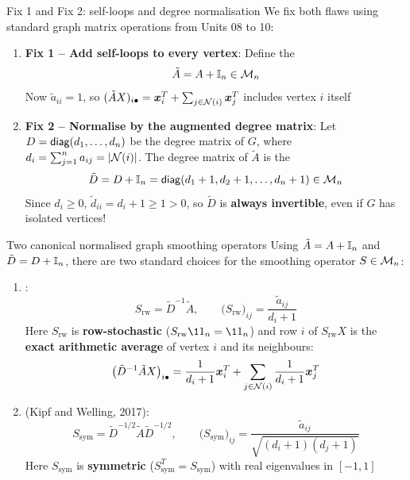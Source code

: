 \documentclass[aspectratio=169]{beamer}\usepackage[]{graphicx}\usepackage[]{xcolor}
\begin{document}
\begin{frame}{Fix 1 and Fix 2: self-loops and degree normalisation}
We fix both flaws using standard graph matrix operations from Units 08 to 10:
\vfill
\begin{enumerate}
\item \textbf{Fix 1 -- Add self-loops to every vertex}:
Define the 
\[
\tilde{A} = A + \mathbb{I}_n \in \mathcal{M}_n
\]
Now $\tilde{a}_{ii} = 1$, so $(\tilde{A}X)_{i\bullet} = \bm{x}_i^T + \sum_{j \in \mathcal{N}(i)} \bm{x}_j^T$ includes vertex $i$ itself
\vfill
\item \textbf{Fix 2 -- Normalise by the augmented degree matrix}:
Let $D = \mathsf{diag}(d_1, \ldots, d_n)$ be the degree matrix of $G$, where $d_i = \sum_{j=1}^n a_{ij} = |\mathcal{N}(i)|$. The degree matrix of $\tilde{A}$ is the 
\[
\tilde{D} = D + \mathbb{I}_n = \mathsf{diag}(d_1 + 1, d_2 + 1, \ldots, d_n + 1) \in \mathcal{M}_n
\]
Since $d_i \ge 0$, $\tilde{d}_{ii} = d_i + 1 \ge 1 > 0$, so $\tilde{D}$ is \textbf{always invertible}, even if $G$ has isolated vertices!
\end{enumerate}
\end{frame}


\begin{frame}{Two canonical normalised graph smoothing operators}
Using $\tilde{A} = A + \mathbb{I}_n$ and $\tilde{D} = D + \mathbb{I}_n$, there are two standard choices for the smoothing operator $S \in \mathcal{M}_n$:
\vfill
\begin{definition}
\label{def:gcn-operators}
\begin{enumerate}
\item {}:
\[
S_{\text{rw}} = \tilde{D}^{-1} \tilde{A}, \qquad \big(S_{\text{rw}}\big)_{ij} = \frac{\tilde{a}_{ij}}{d_i + 1}
\]
Here $S_{\text{rw}}$ is \textbf{row-stochastic} ($S_{\text{rw}} \11_n = \11_n$) and row $i$ of $S_{\text{rw}} X$ is the \textbf{exact arithmetic average} of vertex $i$ and its neighbours:
\[
\big(\tilde{D}^{-1}\tilde{A} X\big)_{i\bullet} = \frac{1}{d_i + 1}\bm{x}_i^T + \sum_{j \in \mathcal{N}(i)} \frac{1}{d_i + 1}\bm{x}_j^T
\]
\item {} (Kipf and Welling, 2017):
\[
S_{\text{sym}} = \tilde{D}^{-1/2} \tilde{A} \tilde{D}^{-1/2}, \qquad \big(S_{\text{sym}}\big)_{ij} = \frac{\tilde{a}_{ij}}{\sqrt{(d_i + 1)(d_j + 1)}}
\]
Here $S_{\text{sym}}$ is \textbf{symmetric} ($S_{\text{sym}}^T = S_{\text{sym}}$) with real eigenvalues in $[-1, 1]$
\end{enumerate}
\end{definition}
\end{frame}
\end{document}
